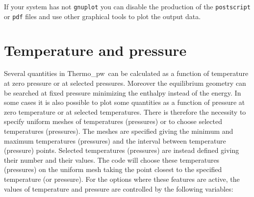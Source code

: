 \documentclass[12pt,a4paper,twoside]{report}
\def\thermo{{\sc Thermo\_pw}}
\begin{document}
If your system has not \texttt{gnuplot}
you can disable the production of the \texttt{postscript} or 
\texttt{pdf} files and use other
graphical tools to plot the output data. 

\newpage
{\color{coral}\section{Temperature and pressure}}
\color{black}
Several quantities in \thermo\ can be calculated as a function of temperature
at zero pressure or at selected pressures.
Moreover the equilibrium geometry can be searched at fixed pressure 
minimizing the enthalpy instead of the energy.
In some cases it is also possible to plot some quantities as a function 
of pressure at zero temperature or at selected temperatures.
There is therefore the necessity to specify uniform meshes of temperatures
(pressures) or to choose selected temperatures (pressures). 
The meshes are specified giving the minimum and maximum temperatures 
(pressures) and the interval between temperature (pressure) points.
Selected temperatures (pressures) are instead defined giving their number 
and their values. The code will choose these temperatures (pressures) on 
the uniform mesh taking the point closest to the specified temperature 
(or pressure).
For the options where these features are active, the values of temperature
and pressure are controlled by the following variables:
\end{document}
